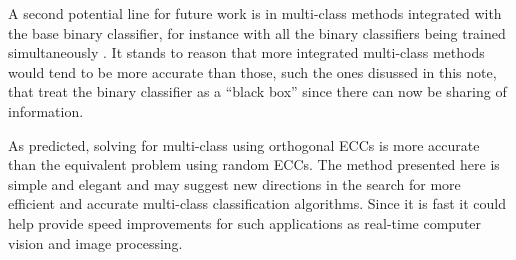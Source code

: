 A second potential line for future work is in multi-class methods integrated
with the base binary classifier, for instance with all the binary classifiers
being trained simultaneously \citep{Hsu_Lin2002}.
It stands to reason that more integrated multi-class methods would tend to
be more accurate than those, such the ones disussed in this note, that treat the
binary classifier as a ``black box'' since there can now be sharing of
information.

As predicted, solving for multi-class using orthogonal ECCs 
is more accurate than the equivalent problem using random ECCs.
The method presented here is simple and elegant and
may suggest new directions in the search for more efficient and
accurate multi-class classification algorithms.
Since it is fast it could help provide speed
improvements for such applications as real-time computer vision
and image processing.

